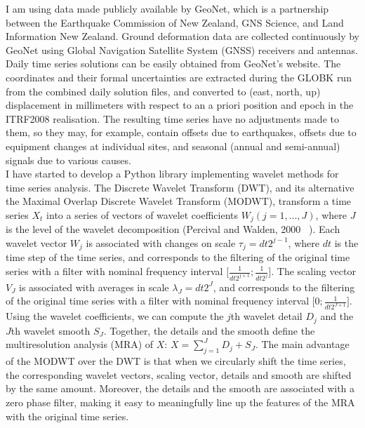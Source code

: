 \documentclass[letterpaper, 12pt]{article}
\begin{document}
I am using data made publicly available by GeoNet, which is a partnership between the Earthquake Commission of New Zealand, GNS Science, and Land Information New Zealand. Ground deformation data are collected continuously by GeoNet using Global Navigation Satellite System (GNSS) receivers and antennas. Daily time series solutions can be easily obtained from GeoNet's website. The coordinates and their formal uncertainties are extracted during the GLOBK run from the combined daily solution files, and converted to (east, north, up) displacement in millimeters with respect to an a priori position and epoch in the ITRF2008 realisation. The resulting time series have no adjustments made to them, so they may, for example, contain offsets due to earthquakes, offsets due to equipment changes at individual sites, and seasonal (annual and semi-annual) signals due to various causes. \\

I have started to develop a Python library implementing wavelet methods for time series analysis. The Discrete Wavelet Transform (DWT), and its alternative the Maximal Overlap Discrete Wavelet Transform (MODWT), transform a time series $X_t$ into a series of vectors of wavelet coefficients $W_j \left(  j= 1 , ... , J \right)$, where $J$ is the level of the wavelet decomposition (Percival and Walden, 2000 ~\cite{PER_2000}). Each wavelet vector $W_j$ is associated with changes on scale $\tau_j = dt 2^{j - 1}$, where $dt$ is the time step of the time series, and corresponds to the filtering of the original time series with a filter with nominal frequency interval $\lbrack \frac{1}{dt 2^{j + 1}} ; \frac{1}{dt 2^j} \rbrack$. The scaling vector $V_J$ is associated with averages in scale $\lambda_J = dt 2^J$, and corresponds to the filtering of the original time series with a filter with nominal frequency interval $\lbrack 0 ; \frac{1}{dt 2^{J + 1}} \rbrack$. Using the wavelet coefficients, we can compute the $j$th wavelet detail $D_j$ and the $J$th wavelet smooth $S_J$. Together, the details and the smooth define the multiresolution analysis (MRA) of $X$: $X = \sum_{j = 1}^{J} D_j + S_J$. The main advantage of the MODWT over the DWT is that when we circularly shift the time series, the corresponding wavelet vectors, scaling vector, details and smooth are shifted by the same amount. Moreover, the details and the smooth are associated with a zero phase filter, making it easy to meaningfully line up the features of the MRA with the original time series. \\
\end{document}
